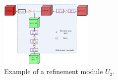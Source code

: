 \renewcommand\arraystretch{1.1}
\setlength{\tabcolsep}{2pt}
\begin{table}
\begin{center}
\end{center}
\caption{Architectural details of the \textit{three-branch} head.
$k$ denotes the number of anchor boxes per RoW.
}
\label{tab:three}
\vspace{-0.2cm}
\end{table}





\renewcommand\arraystretch{1.1}
\setlength{\tabcolsep}{2pt}
\begin{table}
\begin{center}
\end{center}
\caption{Architectural details of the \textit{two-branch} head.
}
\label{tab:two}
\vspace{-0.2cm}
\end{table}


\begin{figure}
\begin{center}
\includegraphics[width=0.4\textwidth]{img/u.pdf}
\end{center}
\vspace{-0.2cm}
\caption{Example of a refinement module $U_3$.}
\label{fig:u}
\end{figure}

